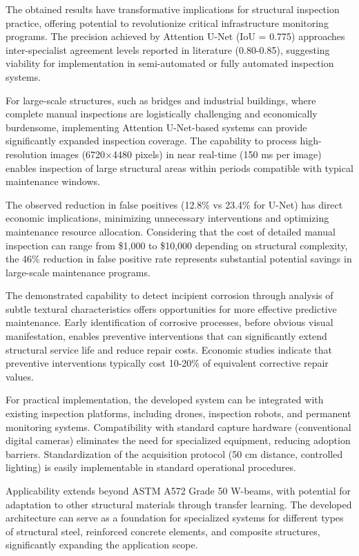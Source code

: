 \documentclass[12pt,a4paper,twoside]{article}
\begin{document}
The obtained results have transformative implications for structural inspection practice, offering potential to revolutionize critical infrastructure monitoring programs. The precision achieved by Attention U-Net (IoU = 0.775) approaches inter-specialist agreement levels reported in literature (0.80-0.85), suggesting viability for implementation in semi-automated or fully automated inspection systems.

For large-scale structures, such as bridges and industrial buildings, where complete manual inspections are logistically challenging and economically burdensome, implementing Attention U-Net-based systems can provide significantly expanded inspection coverage. The capability to process high-resolution images (6720×4480 pixels) in near real-time (150 ms per image) enables inspection of large structural areas within periods compatible with typical maintenance windows.

The observed reduction in false positives (12.8\% vs 23.4\% for U-Net) has direct economic implications, minimizing unnecessary interventions and optimizing maintenance resource allocation. Considering that the cost of detailed manual inspection can range from \$1,000 to \$10,000 depending on structural complexity, the 46\% reduction in false positive rate represents substantial potential savings in large-scale maintenance programs.

The demonstrated capability to detect incipient corrosion through analysis of subtle textural characteristics offers opportunities for more effective predictive maintenance. Early identification of corrosive processes, before obvious visual manifestation, enables preventive interventions that can significantly extend structural service life and reduce repair costs. Economic studies indicate that preventive interventions typically cost 10-20\% of equivalent corrective repair values.

For practical implementation, the developed system can be integrated with existing inspection platforms, including drones, inspection robots, and permanent monitoring systems. Compatibility with standard capture hardware (conventional digital cameras) eliminates the need for specialized equipment, reducing adoption barriers. Standardization of the acquisition protocol (50 cm distance, controlled lighting) is easily implementable in standard operational procedures.

Applicability extends beyond ASTM A572 Grade 50 W-beams, with potential for adaptation to other structural materials through transfer learning. The developed architecture can serve as a foundation for specialized systems for different types of structural steel, reinforced concrete elements, and composite structures, significantly expanding the application scope.
\end{document}
